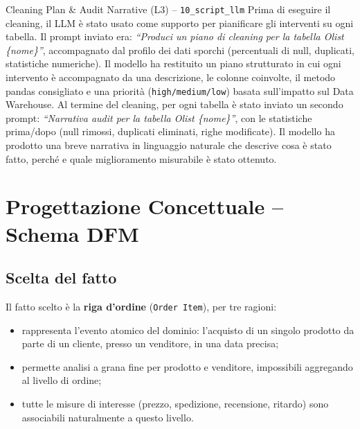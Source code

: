 \documentclass[12pt,a4paper]{article}
\begin{document}
\begin{aibox}{Cleaning Plan \& Audit Narrative (L3) -- \texttt{10\_script\_llm}}
Prima di eseguire il cleaning, il LLM è stato usato come supporto per pianificare
gli interventi su ogni tabella. Il prompt inviato era: \textit{``Produci un piano
di cleaning per la tabella Olist \{nome\}''}, accompagnato dal profilo dei dati
sporchi (percentuali di null, duplicati, statistiche numeriche). Il modello ha
restituito un piano strutturato in cui ogni intervento è accompagnato da una
descrizione, le colonne coinvolte, il metodo pandas consigliato e una priorità
(\texttt{high/medium/low}) basata sull'impatto sul Data Warehouse.
Al termine del cleaning, per ogni tabella è stato inviato un secondo prompt:
\textit{``Narrativa audit per la tabella Olist \{nome\}''}, con le statistiche
prima/dopo (null rimossi, duplicati eliminati, righe modificate). Il modello ha
prodotto una breve narrativa in linguaggio naturale che descrive cosa è stato
fatto, perché e quale miglioramento misurabile è stato ottenuto.
\end{aibox}

\section{Progettazione Concettuale -- Schema DFM}

\subsection{Scelta del fatto}

Il fatto scelto è la \textbf{riga d'ordine} (\texttt{Order Item}), per tre ragioni:

\begin{itemize}
  \item rappresenta l'evento atomico del dominio: l'acquisto di un singolo prodotto
        da parte di un cliente, presso un venditore, in una data precisa;
  \item permette analisi a grana fine per prodotto e venditore, impossibili
        aggregando al livello di ordine;
  \item tutte le misure di interesse (prezzo, spedizione, recensione, ritardo) sono
        associabili naturalmente a questo livello.
\end{itemize}
\end{document}
